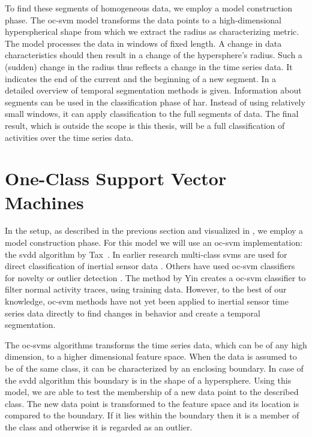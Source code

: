 To find these segments of homogeneous data, we employ a model construction phase.
The \gls{oc-svm} model transforms the data points to a high-dimensional hyperspherical shape from which we extract the radius as characterizing metric.
The model processes the data in windows of fixed length.
A change in data characteristics should then result in a change of the hypersphere's radius.
Such a (sudden) change in the radius thus reflects a change in the time series data.
It indicates the end of the current and the beginning of a new segment.
In  a detailed overview of temporal segmentation methods is given.
Information about segments can be used in the classification phase of \gls{har}.
Instead of using relatively small windows, it can apply classification to the full segments of data.
The final result, which is outside the scope is this thesis, will be a full classification of activities over the time series data.

\section{One-Class Support Vector Machines}
In the setup, as described in the previous section and visualized in , we employ a model construction phase.
For this model we will use an \acrlong{oc-svm} implementation: the \acrlong{svdd} algorithm by Tax~\cite{tax2001one}.
In earlier research multi-class \glspl{svm} are used for direct classification of inertial sensor data \cite{he2008activity,mountrakis2011support,anguita2012human}.
Others have used \gls{oc-svm} classifiers for novelty or outlier detection \cite{scholkopf1999support,camci2010change,li2003improving,ma2003time,tax1999support}.
The method by Yin \etal  \cite{yin2008sensor} creates a \gls{oc-svm} classifier to filter normal activity traces, using training data.
However, to the best of our knowledge, \gls{oc-svm} methods have not yet been applied to inertial sensor time series data directly to find changes in behavior and create a temporal segmentation.

The \glspl{oc-svm} algorithms transforms the time series data, which can be of any high dimension, to a higher dimensional feature space.
When the data is assumed to be of the same class, it can be characterized by an enclosing boundary.
In case of the \gls{svdd} algorithm this boundary is in the shape of a hypersphere.
Using this model, we are able to test the membership of a new data point to the described class.
The new data point is transformed to the feature space and its location is compared to the boundary.
If it lies within the boundary then it is a member of the class and otherwise it is regarded as an outlier.

